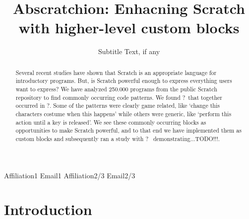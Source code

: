 \documentclass[preprint]{sigplanconf}
\newcommand{\nPatterns}{?}
\newcommand{\nOccurrences}{?}
\newcommand{\nKids}{?}
\newcommand{\todo}{TODO!!!}
\begin{document}
\setlength{\pdfpageheight}{\paperheight}
\setlength{\pdfpagewidth}{\paperwidth}




\title{Abscratchion: Enhacning Scratch with higher-level custom blocks}
\subtitle{Subtitle Text, if any}

           {Affiliation1}
           {Email1}
           {Affiliation2/3}
           {Email2/3}

\maketitle

\begin{abstract}
Several recent studies have shown that Scratch is an appropriate language for introductory programs. But, is Scratch powerful enough to express everything users want to express? We have analyzed 250.000 programs from the public Scratch repository to  find commonly occurring code patterns. We found \nPatterns~that together occurred in \nOccurrences. Some of the patterns were clearly game related, like `change this characters costume when this happens' while others were generic, like `perform this action until a key is released'. We see these commonly occurring blocks as opportunities to make Scratch powerful, and to that end we have implemented them as custom blocks and subsequently ran a study with \nKids~ demonstrating...\todo.


\end{abstract}





\section{Introduction}
\end{document}
